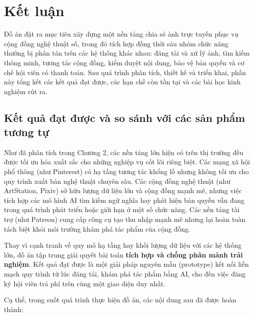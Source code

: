 \section{Kết luận}

Đồ án đặt ra mục tiêu xây dựng một nền tảng chia sẻ ảnh trực tuyến phục vụ cộng đồng nghệ thuật số, trong đó tích hợp đồng thời sáu nhóm chức năng thường bị phân tán trên các hệ thống khác nhau: đăng tải và xử lý ảnh, tìm kiếm thông minh, tương tác cộng đồng, kiểm duyệt nội dung, bảo vệ bản quyền và cơ chế hội viên có thanh toán. Sau quá trình phân tích, thiết kế và triển khai, phần này tổng kết các kết quả đạt được, các hạn chế còn tồn tại và các bài học kinh nghiệm rút ra.

\subsection{Kết quả đạt được và so sánh với các sản phẩm tương tự}

Như đã phân tích trong Chương 2, các nền tảng lớn hiện có trên thị trường đều được tối ưu hóa xuất sắc cho những nghiệp vụ cốt lõi riêng biệt. Các mạng xã hội phổ thông (như Pinterest) có hạ tầng tương tác khổng lồ nhưng không tối ưu cho quy trình xuất bản nghệ thuật chuyên sâu. Các cộng đồng nghệ thuật (như ArtStation, Pixiv) sở hữu lượng dữ liệu lớn và cộng đồng mạnh mẽ, nhưng việc tích hợp các mô hình AI tìm kiếm ngữ nghĩa hay phát hiện bản quyền vẫn đang trong quá trình phát triển hoặc giới hạn ở một số chức năng. Các nền tảng tài trợ (như Patreon) cung cấp công cụ tạo thu nhập mạnh mẽ nhưng lại hoàn toàn tách biệt khỏi môi trường khám phá tác phẩm của cộng đồng.

Thay vì cạnh tranh về quy mô hạ tầng hay khối lượng dữ liệu với các hệ thống lớn, đồ án tập trung giải quyết bài toán \textbf{tích hợp và chống phân mảnh trải nghiệm}. Kết quả đạt được là một giải pháp nguyên mẫu (prototype) kết nối liền mạch quy trình từ lúc đăng tải, khám phá tác phẩm bằng AI, cho đến việc đăng ký hội viên trả phí trên cùng một giao diện duy nhất.

Cụ thể, trong suốt quá trình thực hiện đồ án, các nội dung sau đã được hoàn thành:

